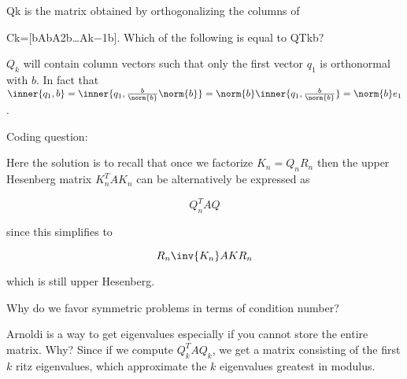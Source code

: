 \documentclass[../main.tex]{subfiles}
\begin{document}
\begin{problem}
    Qk is the matrix obtained by orthogonalizing the columns of

Ck=[bAbA2b…Ak−1b].
Which of the following is equal to QTkb?
\end{problem}

\begin{solution}
    $Q_k$ will contain column vectors such that only the first vector $q_1$ is orthonormal with $b$. In fact that $\inner{q_1, b} = \inner{q_1, \frac{b}{\norm{b}}\norm{b}} = \norm{b}\inner{q_1, \frac{b}{\norm{b}}} = \norm{b} e_1$.
\end{solution}

\begin{problem}
    Coding question:
\end{problem}

\begin{solution}
    Here the solution is to recall that once we factorize $K_n = Q_nR_n$ then the upper Hesenberg matrix $K_n^T A K_n$ can be alternatively be expressed as

    \[
        Q_n^T A Q
    \]

    since this simplifies to

    \[
        R_n \inv{K_n} A K R_n
    \]

    which is still upper Hesenberg.
\end{solution}

\begin{question}
    Why do we favor symmetric problems in terms of condition number?
\end{question}

\begin{remark}
    Arnoldi is a way to get eigenvalues especially if you cannot store the entire matrix. Why? Since if we compute $Q_k^TAQ_k$, we get a matrix consisting of the first $k$ ritz eigenvalues, which approximate the $k$ eigenvalues greatest in modulus.
\end{remark}
\end{document}
